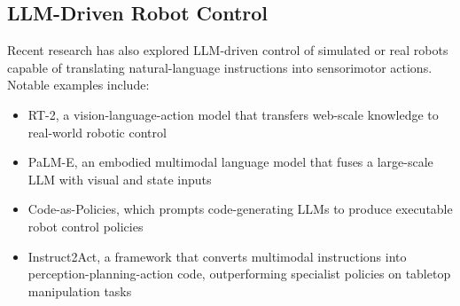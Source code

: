 \documentclass[../report.tex]{subfiles}
\begin{document}
    \subsection{LLM-Driven Robot Control}
    Recent research has also explored LLM-driven control of simulated or real robots capable of translating natural-language instructions into sensorimotor actions. Notable examples include:
    \begin{itemize}
        \item RT-2, a vision-language-action model that transfers web-scale knowledge to real-world robotic control \cite{rt2}
        \item PaLM-E, an embodied multimodal language model that fuses a large-scale LLM with visual and state inputs \cite{palme}
        \item Code-as-Policies, which prompts code-generating LLMs to produce executable robot control policies \cite{codeaspolicies}
        \item Instruct2Act, a framework that converts multimodal instructions into perception-planning-action code, outperforming specialist policies on tabletop manipulation tasks \cite{instruct2act}
    \end{itemize}
\end{document}

